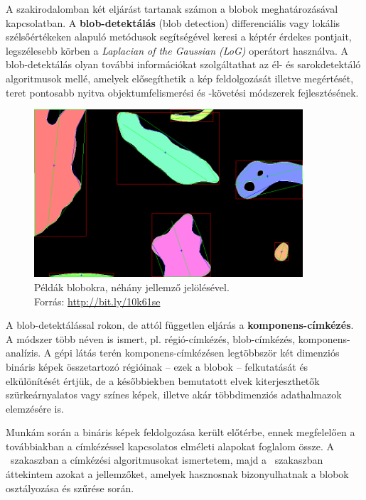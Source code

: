 \bigskip

A szakirodalomban két eljárást tartanak számon a blobok meghatározásával kapcsolatban. A \textbf{blob-detektálás} (blob detection) differenciális vagy lokális szélsőértékeken alapuló metódusok segítségével keresi a képtér érdekes pontjait, legszélesebb körben a \emph{Laplacian of the Gaussian (LoG)} operátort használva. A blob-detektálás olyan további információkat szolgáltathat az él- és sarokdetektáló algoritmusok mellé, amelyek elősegíthetik a kép feldolgozását illetve megértését, teret pontosabb nyitva objektumfelismerési és -követési módszerek fejlesztésének.

\begin{figure}[!ht]
\centering
\includegraphics[width=100mm, keepaspectratio]{figures/blob_sshot.png}
\caption{Példák blobokra, néhány jellemző jelölésével.\\Forrás: \url{http://bit.ly/10k61se}}
\label{fig:blob_sshot}
\end{figure}

A blob-detektálással rokon, de attól független eljárás a \textbf{komponens-címkézés}. A módszer több néven is ismert, pl. régió-címkézés, blob-címkézés, komponens-analízis. A gépi látás terén komponens-címkézésen legtöbbször két dimenziós bináris képek összetartozó régióinak -- ezek a blobok -- felkutatását és elkülönítését értjük, de a későbbiekben bemutatott elvek kiterjeszthetők szürkeárnyalatos vagy színes képek, illetve akár többdimenziós adathalmazok elemzésére is.

\bigskip

Munkám során a bináris képek feldolgozása került előtérbe, ennek megfelelően a továbbiakban a címkézéssel kapcsolatos elméleti alapokat foglalom össze. A ~szakaszban a címkézési algoritmusokat ismertetem, majd a ~szakaszban áttekintem azokat a jellemzőket, amelyek hasznosnak bizonyulhatnak a blobok osztályozása és szűrése során.

